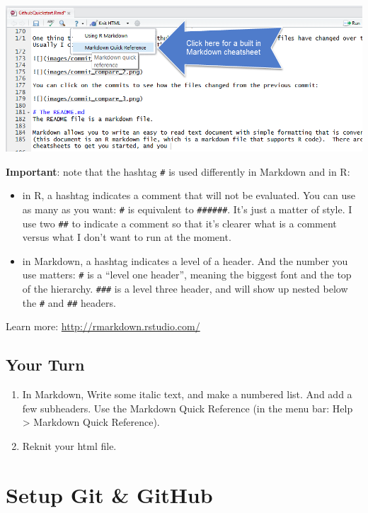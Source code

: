 \documentclass[]{book}
\providecommand{\tightlist}{%
  \setlength{\itemsep}{0pt}\setlength{\parskip}{0pt}}
\theoremstyle{definition}
\theoremstyle{definition}
\theoremstyle{definition}
\theoremstyle{remark}
\begin{document}
\includegraphics{img/md_cheatsheet.png}

\textbf{Important}: note that the hashtag \texttt{\#} is used
differently in Markdown and in R:

\begin{itemize}
\tightlist
\item
  in R, a hashtag indicates a comment that will not be evaluated. You
  can use as many as you want: \texttt{\#} is equivalent to
  \texttt{\#\#\#\#\#\#}. It's just a matter of style. I use two
  \texttt{\#\#} to indicate a comment so that it's clearer what is a
  comment versus what I don't want to run at the moment.
\item
  in Markdown, a hashtag indicates a level of a header. And the number
  you use matters: \texttt{\#} is a ``level one header'', meaning the
  biggest font and the top of the hierarchy. \texttt{\#\#\#} is a level
  three header, and will show up nested below the \texttt{\#} and
  \texttt{\#\#} headers.
\end{itemize}

Learn more: \url{http://rmarkdown.rstudio.com/}

\subsection{Your Turn}\label{your-turn-2}

\begin{enumerate}
\def\labelenumi{\arabic{enumi}.}
\tightlist
\item
  In Markdown, Write some italic text, and make a numbered list. And add
  a few subheaders. Use the Markdown Quick Reference (in the menu bar:
  Help \textgreater{} Markdown Quick Reference).
\item
  Reknit your html file.
\end{enumerate}

\section{Setup Git \& GitHub}\label{setup-git-github}
\end{document}
